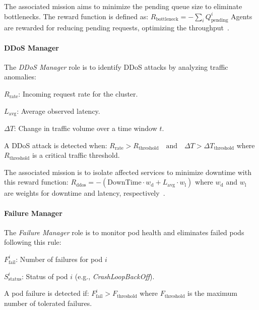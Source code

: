 The associated mission aims to minimize the pending queue size to eliminate bottlenecks. The reward function is defined as: $R_{\text{bottleneck}} = - \sum_{i} Q_{\text{pending}}^i$
Agents are rewarded for reducing pending requests, optimizing the throughput~\cite{burns2016borg}.

\noindent \paragraph{\textbf{DDoS Manager}}

The \textit{DDoS Manager} role is to identify DDoS attacks by analyzing traffic anomalies:
\begin{enumerate*}[label={}, itemjoin={;\quad }]
  \item \( R_{\text{rate}} \): Incoming request rate for the cluster.
  \item \( L_{\text{avg}} \): Average observed latency.
  \item \( \Delta T \): Change in traffic volume over a time window \( t \).
\end{enumerate*}
A DDoS attack is detected when:
$R_{\text{rate}} > R_{\text{threshold}} \quad \text{and} \quad \Delta T > \Delta T_{\text{threshold}}$
where \( R_{\text{threshold}} \) is a critical traffic threshold.

The associated mission is to isolate affected services to minimize downtime with this reward function:
$R_{\text{ddos}} = - \left( \text{DownTime} \cdot w_{\text{d}} + L_{\text{avg}} \cdot w_{\text{l}} \right)$
where \( w_{\text{d}} \) and \( w_{\text{l}} \) are weights for downtime and latency, respectively~\cite{Liu2018}.

\noindent \paragraph{\textbf{Failure Manager}}

The \textit{Failure Manager} role is to monitor pod health and eliminates failed pods following this rule:
\begin{enumerate*}[label={}, itemjoin={;\quad }]
  \item \( F_{\text{fail}}^i \): Number of failures for pod \( i \)
  \item \( S_{\text{status}}^i \): Status of pod \( i \) (e.g., \textit{CrashLoopBackOff}).
\end{enumerate*}
A pod failure is detected if:
$F_{\text{fail}}^i > F_{\text{threshold}}$
where \( F_{\text{threshold}} \) is the maximum number of tolerated failures.

